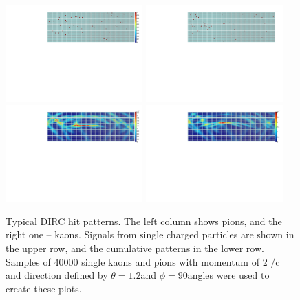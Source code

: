 \begin{figure}[!h]
\centering
\includegraphics[angle=0,width=0.47\textwidth]{pics/kaon2GeVa.pdf} \hspace{0.5cm} \includegraphics[angle=0,width=0.47\textwidth]{pics/pion2GeVa.pdf}\\
\includegraphics[angle=0,width=0.47\textwidth]{pics/kaons2GeV.pdf} \hspace{0.5cm} \includegraphics[angle=0,width=0.47\textwidth]{pics/pions2GeV.pdf}
\caption{\label{pic:hitpat1}
Typical \gluex DIRC hit patterns. The left column shows pions, and the right one -- kaons. 
Signals from single charged particles are shown in the upper row, and the cumulative patterns in the lower row.
Samples of $40000$ single kaons and pions with momentum of 2 {\gev}/c and direction defined by $\theta = 1.2$\mydeg and $\phi = 90$\mydeg angles were used to create these plots.
}
\end{figure}

